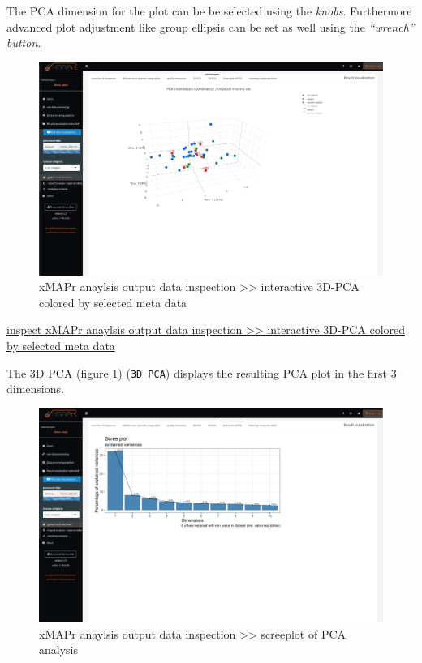 \documentclass[]{book}
\theoremstyle{definition}
\theoremstyle{definition}
\theoremstyle{definition}
\theoremstyle{remark}
\begin{document}
The PCA dimension for the plot can be be selected using the
\emph{knobs}. Furthermore advanced plot adjustment like group ellipsis
can be set as well using the \emph{``wrench'' button}.

\begin{figure}
\includegraphics[width=50.5in]{figures/global_result_overview_PCA3D} \caption{xMAPr anaylsis output data inspection >> interactive 3D-PCA colored by selected meta data}\label{fig:PCA3D}
\end{figure}

\href{figures/global_result_overview_PCA3D.png}{inspect xMAPr anaylsis
output data inspection \textgreater{}\textgreater{} interactive 3D-PCA
colored by selected meta data}

The 3D PCA (figure \ref{fig:PCA3D}) (\texttt{3D\ PCA}) displays the
resulting PCA plot in the first 3 dimensions.

\begin{figure}
\includegraphics[width=50.5in]{figures/global_result_overview_PCA_scree} \caption{xMAPr anaylsis output data inspection >> screeplot of PCA analysis}\label{fig:PCAscreeplot}
\end{figure}
\end{document}
